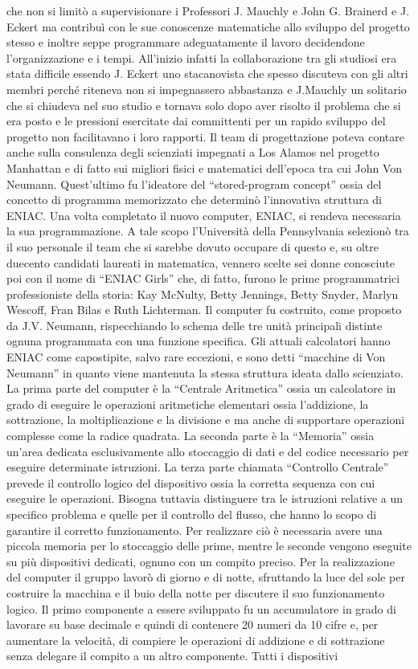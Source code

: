 che non si limitò a supervisionare i Professori J. Mauchly e John G. Brainerd e J. Eckert ma contribuì con le sue conoscenze matematiche allo sviluppo del progetto stesso e inoltre seppe programmare adeguatamente il lavoro decidendone l’organizzazione e i tempi. All’inizio infatti la collaborazione tra gli studiosi era stata difficile essendo J. Eckert uno stacanovista che spesso discuteva con gli altri membri perché riteneva non si impegnassero abbastanza e J.Mauchly un solitario che si chiudeva nel suo studio e tornava solo dopo aver risolto il problema che si era posto e le pressioni esercitate dai committenti per un rapido sviluppo del progetto non facilitavano i loro rapporti.  Il team di progettazione poteva contare anche sulla consulenza degli scienziati impegnati a Los Alamos nel progetto Manhattan e di fatto sui migliori fisici e matematici dell’epoca tra cui John Von Neumann. Quest’ultimo fu l’ideatore del “stored-program concept” ossia del concetto di programma memorizzato che determinò l’innovativa struttura di ENIAC\@.  Una volta completato il nuovo computer, ENIAC, si rendeva necessaria la sua programmazione.  A tale scopo l’Università della Pennsylvania selezionò tra il suo personale il team che si sarebbe dovuto occupare di questo e, su oltre duecento candidati laureati in matematica, vennero scelte sei donne conosciute poi con il nome di “ENIAC Girls” che, di fatto, furono le prime programmatrici professioniste della storia: Kay McNulty, Betty Jennings, Betty Snyder, Marlyn Wescoff, Fran Bilas e Ruth Lichterman.  Il computer fu costruito, come proposto da J.V. Neumann, rispecchiando lo schema delle tre unità principali distinte ognuna programmata con una funzione specifica. Gli attuali calcolatori hanno ENIAC come capostipite, salvo rare eccezioni, e sono detti “macchine di Von Neumann” in quanto viene mantenuta la stessa struttura ideata dallo scienziato. La prima parte del computer è la “Centrale Aritmetica” ossia un calcolatore in grado di eseguire le operazioni aritmetiche elementari ossia l’addizione, la sottrazione, la moltiplicazione e la divisione e ma anche di supportare operazioni complesse come la radice quadrata. La seconda parte è la “Memoria” ossia un’area dedicata esclusivamente allo stoccaggio di dati e del codice necessario per eseguire determinate istruzioni. La terza parte chiamata “Controllo Centrale” prevede il controllo logico del dispositivo ossia la corretta sequenza con cui eseguire le operazioni. Bisogna tuttavia distinguere tra le istruzioni relative a un specifico problema e quelle per il controllo del flusso, che hanno lo scopo di garantire il corretto funzionamento. Per realizzare ciò è necessaria avere una piccola memoria per lo stoccaggio delle prime, mentre le seconde vengono eseguite su più dispositivi dedicati, ognuno con un compito preciso. Per la realizzazione del computer il gruppo lavorò di giorno e di notte, sfruttando la luce del sole per costruire la macchina e il buio della notte per discutere il suo funzionamento logico. Il primo componente a essere sviluppato fu un accumulatore in grado di lavorare su base decimale e quindi di contenere 20 numeri da 10 cifre e, per aumentare la velocità, di compiere le operazioni di addizione e di sottrazione senza delegare il compito a un altro componente. Tutti i dispositivi 